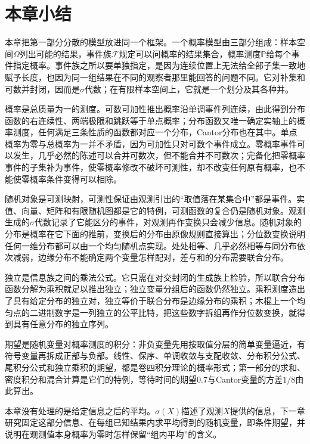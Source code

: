\section{本章小结}
\label{sec:pspace-summary}

本章把第一部分分散的模型放进同一个框架。一个概率模型由三部分组成：样本空间$\Omega$列出可能的结果，事件族$\mathcal{F}$规定可以问概率的结果集合，概率测度$\mathbb{P}$给每个事件指定概率。事件族之所以要单独指定，是因为连续位置上无法给全部子集一致地赋予长度，也因为同一组结果在不同的观察者那里能回答的问题不同。它对补集和可数并封闭，因而是$\sigma$代数；在有限样本空间上，它就是一个划分及其各种并。

概率是总质量为一的测度。可数可加性推出概率沿单调事件列连续，由此得到分布函数的右连续性、两端极限和跳跃等于单点概率；分布函数又唯一确定实轴上的概率测度，任何满足三条性质的函数都对应一个分布，Cantor分布也在其中。单点概率为零与总概率为一并不矛盾，因为可加性只对可数个事件成立。零概率事件可以发生，几乎必然的陈述可以合并可数次，但不能合并不可数次；完备化把零概率事件的子集补为事件，使零概率修改不破坏可测性，却不改变任何原有概率，也不能使零概率条件变得可以相除。

随机对象是可测映射，可测性保证由观测引出的“取值落在某集合中”都是事件。实值、向量、矩阵和有限随机图都是它的特例，可测函数的复合仍是随机对象。观测生成的$\sigma$代数记录了它能区分的事件，对观测再作变换只会减少信息。随机对象的分布是概率在它下面的推前，变换后的分布由原像规则直接算出；分位数变换说明任何一维分布都可以由一个均匀随机点实现。处处相等、几乎必然相等与同分布依次减弱，边缘分布不能确定两个变量怎样配对，差与和的分布需要联合分布。

独立是信息族之间的乘法公式。它只需在对交封闭的生成族上检验，所以联合分布函数分解为乘积就足以推出独立；独立变量分组后的函数仍然独立。乘积测度造出了具有给定分布的独立对，独立等价于联合分布是边缘分布的乘积；木棍上一个均匀点的二进制数字是一列独立的公平比特，把这些数字拆组再作分位数变换，就得到具有任意分布的独立序列。

期望是随机变量对概率测度的积分：非负变量先用按取值分层的简单变量逼近，有符号变量再拆成正部与负部。线性、保序、单调收敛与支配收敛、分布积分公式、尾积分公式和独立乘积的期望，都是卷四积分理论的概率形式；第一部分的求和、密度积分和混合计算是它们的特例，等待时间的期望$0.7$与Cantor变量的方差$1/8$由此算出。

本章没有处理的是给定信息之后的平均。$\sigma(X)$描述了观测$X$提供的信息，下一章研究固定这部分信息、在每组已知结果内求平均得到的随机变量，即条件期望，并说明在观测值本身概率为零时怎样保留“组内平均”的含义。
